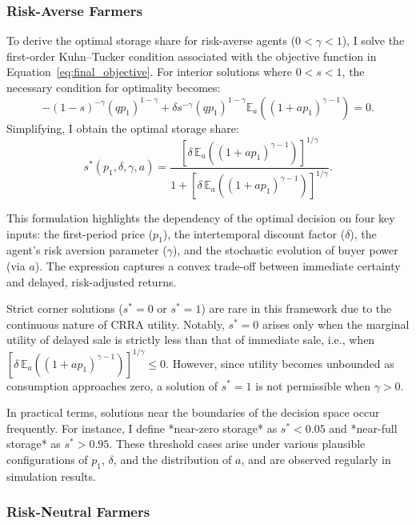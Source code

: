 \subsubsection{Risk-Averse Farmers}

\noindent To derive the optimal storage share for risk-averse agents ($0 < \gamma < 1$), I solve the first-order Kuhn–Tucker condition associated with the objective function in Equation~\ref{eq:final_objective}. For interior solutions where $0 < s < 1$, the necessary condition for optimality becomes:
\begin{equation}
    -(1 - s)^{-\gamma}(q p_1)^{1 - \gamma} + \delta s^{-\gamma}(q p_1)^{1 - \gamma} \mathbb{E}_a\left( (1 + a p_1)^{\gamma-1} \right) = 0.
\end{equation}
\noindent Simplifying, I obtain the optimal storage share:
\begin{equation}
\label{eq:s_star}
s^*(p_1, \delta, \gamma, a) = \frac{\left[\delta\, \mathbb{E}_a\left( (1 + a p_1)^{\gamma - 1} \right)\right]^{1/\gamma}}{1 + \left[\delta\, \mathbb{E}_a\left( (1 + a p_1)^{\gamma - 1} \right)\right]^{1/\gamma}}.
\end{equation}

This formulation highlights the dependency of the optimal decision on four key inputs: the first-period price ($p_1$), the intertemporal discount factor ($\delta$), the agent’s risk aversion parameter ($\gamma$), and the stochastic evolution of buyer power (via $a$). The expression captures a convex trade-off between immediate certainty and delayed, risk-adjusted returns.

Strict corner solutions ($s^* = 0$ or $s^* = 1$) are rare in this framework due to the continuous nature of CRRA utility. Notably, $s^* = 0$ arises only when the marginal utility of delayed sale is strictly less than that of immediate sale, i.e., when $\left[\delta\, \mathbb{E}_a\left( (1 + a p_1)^{\gamma - 1} \right)\right]^{1/\gamma} \leq 0$. However, since utility becomes unbounded as consumption approaches zero, a solution of $s^* = 1$ is not permissible when $\gamma > 0$.

In practical terms, solutions near the boundaries of the decision space occur frequently. For instance, I define *near-zero storage* as $s^* < 0.05$ and *near-full storage* as $s^* > 0.95$. These threshold cases arise under various plausible configurations of $p_1$, $\delta$, and the distribution of $a$, and are observed regularly in simulation results.

\subsubsection{Risk-Neutral Farmers}

